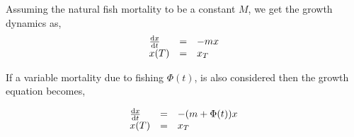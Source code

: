 
Assuming the natural fish mortality to be a constant $M$, we get the growth dynamics as,
\begin{equation}
\begin{array}{lll}
\frac{\mathrm{d} x}{{\mathrm{d} t}}&=&-mx\\
x(T)&=&x_T
\end{array}
\end{equation}

If a variable mortality due to fishing $\Phi(t)$, is also considered then the growth equation becomes,


\begin{equation}
	\begin{array}{lll}
		\frac{\mathrm{d} x}{{\mathrm{d} t}}&=&-(m+\Phi(t))x\\
		x(T)&=&x_T\\
	\end{array}
\end{equation}




